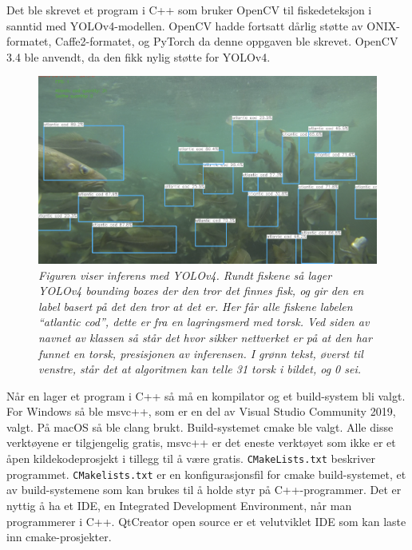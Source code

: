 Det ble skrevet et program i C++ som bruker OpenCV til fiskedeteksjon i sanntid med YOLOv4-modellen. OpenCV hadde fortsatt dårlig støtte av ONIX-formatet, Caffe2-formatet, og PyTorch da denne oppgaven ble skrevet. OpenCV 3.4 ble anvendt, da den fikk nylig støtte for YOLOv4. \cite{Batanina 2020}

\begin{figure}
\begin{center} 
\includegraphics[scale=0.35]{figures/inference_yolo}
\caption{\small \sl Figuren viser inferens med YOLOv4. Rundt fiskene så lager YOLOv4 bounding boxes der den tror det finnes fisk, og gir den en label basert på det den tror at det er. Her får alle fiskene labelen ``atlantic cod'', dette er fra en lagringsmerd med torsk. Ved siden av navnet av klassen så står det hvor sikker nettverket er på at den har funnet en torsk, presisjonen av inferensen. I grønn tekst, øverst til venstre, står det at algoritmen kan telle 31 torsk i bildet, og 0 sei. \label{fig:yolo_inference}} 
\end{center} 
\end{figure} 

Når en lager et program i C++ så må en kompilator og et build-system bli valgt. For Windows så ble msvc++, som er en del av Visual Studio Community 2019, valgt. På macOS så ble clang brukt. Build-systemet cmake ble valgt. Alle disse verktøyene er tilgjengelig gratis, msvc++ er det eneste verktøyet som ikke er et åpen kildekodeprosjekt i tillegg til å være gratis. \texttt{CMakeLists.txt} beskriver programmet. \texttt{CMakelists.txt} er en konfigurasjonsfil for cmake build-systemet, et av build-systemene som kan brukes til å holde styr på C++-programmer. Det er nyttig å ha et IDE, en Integrated Development Environment, når man programmerer i C++. QtCreator open source er et velutviklet IDE som kan laste inn cmake-prosjekter.

